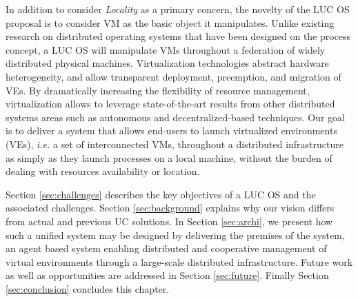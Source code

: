 \medskip

In addition to consider \emph{Locality} as a primary concern, the novelty of the LUC OS
proposal is to consider VM as the basic object it manipulates.  Unlike existing
research on distributed operating systems that have been designed on the process concept, a LUC OS will manipulate VMs throughout a federation of widely distributed
physical machines. Virtualization technologies abstract hardware heterogeneity, and allow
transparent deployment, preemption, and migration of VEs.
By dramatically increasing the flexibility of resource management, virtualization 
allows to leverage state-of-the-art results from other distributed
systems areas such as autonomous and decentralized-based techniques.  
Our goal is to deliver a system that allows end-users to launch virtualized
environments (VEs), \textit{i.e.} a set of interconnected VMs, throughout a
distributed infrastructure as simply as they launch processes on a
local machine, \ie  without the burden of dealing with resources
availability or location. 

Section \ref{sec:challenges} describes the key objectives of a LUC OS and the associated challenges. 
Section \ref{sec:background} explains why our vision differs from actual and previous UC solutions. In
Section \ref{sec:archi}, we present how such a unified system may be designed
by delivering the premises of the \discovery system, an agent based system
enabling distributed and cooperative management of virtual environments through a
large-scale distributed infrastructure.
Future work as well as opportunities  are addressed in Section \ref{sec:future}. Finally Section
\ref{sec:conclusion} concludes this chapter. 
